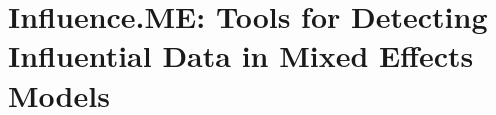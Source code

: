 \documentclass[Main.tex]{subfiles}
\begin{document}
	
	\section*{Influence.ME: Tools for Detecting Influential Data in Mixed Effects Models}
	
	
\end{document}
